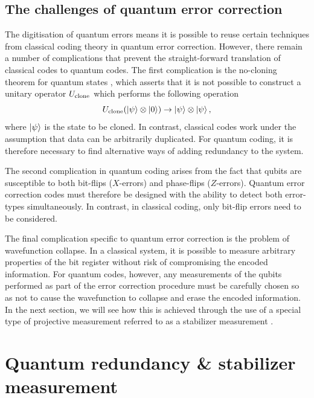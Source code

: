 \documentclass[]{arxiv}
\theoremstyle{plain}%
\theoremstyle{definition}
\theoremstyle{remark}
\begin{document}
\subsection{The challenges of quantum error correction}

The digitisation of quantum errors means it is possible to reuse certain techniques from classical coding theory in quantum error correction. However, there remain a number of complications that prevent the straight-forward translation of classical codes to quantum codes. The first complication is the no-cloning theorem for quantum states  \cite{Wootters82}, which asserts that it is not possible to construct a unitary operator $U_{\rm clone}$ which performs the following operation
%
\begin{equation} \label{eq:no_cloning}
U_{\rm clone}(\ket{\psi}\otimes \ket{0})\rightarrow \ket{\psi}\otimes\ket{\psi}\rm,
\end{equation}
%
where $\ket{\psi}$ is the state to be cloned. In contrast, classical codes work under the assumption that data can be arbitrarily duplicated. For quantum coding, it is therefore necessary to find alternative ways of adding redundancy to the system.

The second complication in quantum coding arises from the fact that qubits are susceptible to both bit-flips ($X$-errors) and phase-flips ($Z$-errors). Quantum error correction codes must therefore be designed with the ability to detect both error-types simultaneously. In contrast, in classical coding, only bit-flip errors need to be considered.

The final complication specific to quantum error correction is the problem of wavefunction collapse. In a classical system, it is possible to measure arbitrary properties of the bit register without risk of compromising the encoded information. For quantum codes, however, any measurements of the qubits performed as part of the error correction procedure must be carefully chosen so as not to cause the wavefunction to collapse and erase the encoded information. In the next section, we will see how this is achieved through the use of a special type of projective measurement referred to as a stabilizer measurement \cite{Gottesman97}.




\section{Quantum redundancy \& stabilizer measurement} \label{sec:2qubit}
\end{document}
